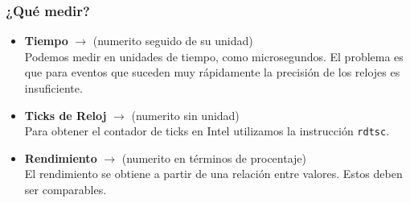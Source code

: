 \documentclass[aspectratio=169]{beamer}
\begin{document}
\begin{frame}[fragile]
    \frametitle{ \vspace{-1cm} \flushright \colorbox{verdeuca}{ \small \textcolor{white}{ \footnotesize \secname } }\\
    ¿Qué medir?}
    \begin{itemize}
     \item \Large \textbf{Tiempo} \normalsize $\rightarrow$ \textcolor{naranjauca}{(numerito seguido de su unidad)}\\
     Podemos medir en unidades de tiempo, como microsegundos.
     El problema es que para eventos que suceden muy rápidamente la precisión de los relojes es insuficiente.
     \vskip 20pt \pause
     \item \Large \textbf{Ticks de Reloj} \normalsize $\rightarrow$ \textcolor{naranjauca}{(numerito sin unidad)}\\
     Para obtener el contador de ticks en Intel utilizamos la instrucción \texttt{rdtsc}.
     \vskip 20pt \pause
     \item \Large \textbf{Rendimiento} \normalsize $\rightarrow$ \textcolor{naranjauca}{(numerito en términos de procentaje)}\\
     El rendimiento se obtiene a partir de una relación entre valores. Estos deben ser comparables.
    \end{itemize}
\end{frame}
\end{document}
